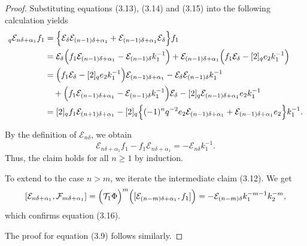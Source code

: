 \documentclass[12pt]{amsart}
\numberwithin{equation}{section}
\numberwithin{equation}{section}
\begin{document}
\begin{proof}
Substituting equations (3.13), (3.14) and (3.15) into the following calculation yields
\begin{align*}
[2]_q\mathcal{E}_{n\delta+\alpha_1}f_1&=\Bigl\{\mathcal{E}_{\delta}\mathcal{E}_{(n-1)\delta+\alpha_1} + \mathcal{E}_{(n-1)\delta+\alpha_1}\mathcal{E}_{\delta}\Bigr\}f_1\\
&=\mathcal{E}_{\delta}\Bigl(f_1\mathcal{E}_{(n-1)\delta+\alpha_1} - \mathcal{E}_{(n-1)\delta}k_1^{-1}\Bigr) + \mathcal{E}_{(n-1)\delta+\alpha_1}\Bigl(f_1\mathcal{E}_{\delta} - [2]_qe_2k_1^{-1}\Bigr)\\
&= \Bigl(f_1\mathcal{E}_{\delta} - [2]_qe_2k_1^{-1}\Bigr)\mathcal{E}_{(n-1)\delta+\alpha_1} - \mathcal{E}_{\delta}\mathcal{E}_{(n-1)\delta}k_1^{-1} \\
&\quad+ \Bigl(f_1\mathcal{E}_{(n-1)\delta+\alpha_1} - \mathcal{E}_{(n-1)\delta}k_1^{-1}\Bigr)\mathcal{E}_{\delta} - [2]_q\mathcal{E}_{(n-1)\delta+\alpha_1}e_2k_1^{-1} \\
&= [2]_qf_1\mathcal{E}_{(n+1)\delta+\alpha_1} - [2]_q\Bigl\{(-1)^n q^{-2}e_2\mathcal{E}_{(n-1)\delta+\alpha_1}+ \mathcal{E}_{(n-1)\delta+\alpha_1}e_2\Bigr\}k_1^{-1}.
\end{align*}

By the definition of \(\mathcal{E}_{n\delta}\), we obtain
\[
\mathcal{E}_{n\delta+\alpha_1}f_1 - f_1\mathcal{E}_{n\delta+\alpha_1} = -\mathcal{E}_{n\delta}k_1^{-1}.
\]
Thus, the claim holds for all \(n \ge 1\) by induction.

To extend to the case \(n > m\), we iterate the intermediate claim (3.12). We get
\[
[\mathcal{E}_{n\delta+\alpha_1}, \mathcal{F}_{m\delta+\alpha_1}] = \Bigl(\mathcal{T}_1\Phi\Bigr)^m\Bigl([\mathcal{E}_{(n-m)\delta+\alpha_1}, f_1]\Bigr)= -\mathcal{E}_{(n-m)\delta}k_1^{-m-1}k_2^{-m},
\]
which confirms equation (3.16). 

The proof for equation (3.9) follows similarly.
\end{proof}
\end{document}
